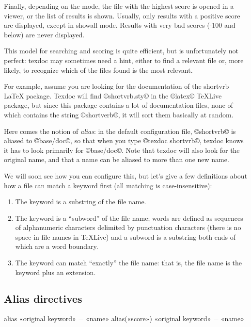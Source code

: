 \documentclass[a4paper, oneside]{scrartcl}
\makeatletter
\newcommand\texlive{%
  \TeX\thinspace Live\xspace}
\newcommand\latex{\LaTeX\xspace}
\newenvironment{htcode}{%
  \SaveVerbatim[samepage, gobble=2]{verbmat}%
  }{%
  \endSaveVerbatim
  \par\medskip\noindent\hspace*{\parindent}%
  \BUseVerbatim{verbmat}%
  \par\medskip\@endpetrue}
\makeatother
\begin{document}
Finally, depending on the mode, the file with the highest score is opened in a
viewer, or the list of results is shown. Usually, only results with a positive
score are displayed, except in showall mode. Results with very bad scores
(-100 and below) are never displayed.

\medskip

This model for searching and scoring is quite efficient, but is unfortunately
not perfect: texdoc may sometimes need a hint, either to find a relevant file
or, more likely, to recognize which of the files found is the most relevant.

For example, assume you are looking for the documentation of the shortvrb
\latex package. Texdoc will find ©shortvrb.sty© in the ©latex© \texlive
package, but since this package contains a lot of documentation files, none of
which contains the string ©shortverb©, it will sort them basically at random.

Here comes the notion of \emph{alias}: in the default configuration file,
©shortvrb© is aliased to ©base/doc©, so that when you type ©texdoc shortvrb©,
texdoc knows it has to look primarily for ©base/doc©. Note that texdoc will
also look for the original name, and that a name can be aliased to more than
one new name.

\medskip

We will soon see how you can configure this, but let's give a few definitions
about how a file can match a keyword first (all matching is case-insensitive):
\begin{enumerate}
  \item The keyword is a substring of the file name.
  \item The keyword is a ``subword'' of the file name; words are defined as
    sequences of alphanumeric characters delimited by punctuation characters
    (there is no space in file names in \texlive) and a subword is a
    substring both ends of which are a word boundary.
  \item The keyword can match ``exactly'' the file name: that is, the file
    name is the keyword plus an extension.
\end{enumerate}

\subsection{Alias directives}\label{ss-alias}

\begin{htcode}
  alias «original keyword» = «name»
  alias(«score») «original keyword» = «name»
\end{htcode}
\end{document}

